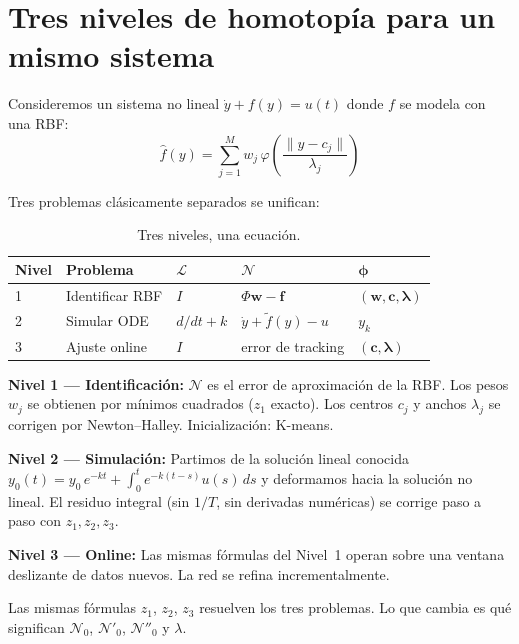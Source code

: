 \documentclass[11pt,a4paper]{article}
\begin{document}
\section{Tres niveles de homotop\'ia para un mismo sistema}

Consideremos un sistema no lineal $\dot{y} + f(y) = u(t)$ donde $f$ se modela con una RBF:
$$\hat{f}(y) = \sum_{j=1}^{M} w_j\,\varphi\!\left(\frac{\|y - c_j\|}{\lambda_j}\right)$$

Tres problemas cl\'asicamente separados se unifican:

\begin{table}[H]
\centering
\caption{Tres niveles, una ecuaci\'on.}
\begin{tabular}{C{1cm} L{2.8cm} C{1.5cm} L{3.5cm} L{2.5cm}}
\toprule
\textbf{Nivel} & \textbf{Problema} & $\boldsymbol{\mathcal{L}}$ & $\boldsymbol{\mathcal{N}}$ & $\boldsymbol{\phi}$ \\
 & Identificar RBF & $I$ & $\Phi\mathbf{w} - \mathbf{f}$ & $(\mathbf{w}, \mathbf{c}, \boldsymbol{\lambda})$ \\
2 & Simular ODE & $d/dt + k$ & $\dot{y} + \tilde{f}(y) - u$ & $y_k$ \\
3 & Ajuste online & $I$ & error de tracking & $(\mathbf{c}, \boldsymbol{\lambda})$ \\
\bottomrule
\end{tabular}
\end{table}

\textbf{Nivel 1 --- Identificaci\'on:} $\mathcal{N}$ es el error de aproximaci\'on de la RBF. Los pesos $w_j$ se obtienen por m\'inimos cuadrados ($z_1$ exacto). Los centros $c_j$ y anchos $\lambda_j$ se corrigen por Newton--Halley. Inicializaci\'on: K-means.

\textbf{Nivel 2 --- Simulaci\'on:} Partimos de la soluci\'on lineal conocida $y_0(t) = y_0\,e^{-kt} + \int_0^t e^{-k(t-s)} u(s)\,ds$ y deformamos hacia la soluci\'on no lineal. El residuo integral (sin $1/T$, sin derivadas num\'ericas) se corrige paso a paso con $z_1, z_2, z_3$.

\textbf{Nivel 3 --- Online:} Las mismas f\'ormulas del Nivel~1 operan sobre una ventana deslizante de datos nuevos. La red se refina incrementalmente.

\begin{clave}
Las mismas f\'ormulas $z_1$, $z_2$, $z_3$ resuelven los tres problemas. Lo que cambia es qu\'e significan $\mathcal{N}_0$, $\mathcal{N}'_0$, $\mathcal{N}''_0$ y $\lambda$.
\end{clave}
\end{document}
